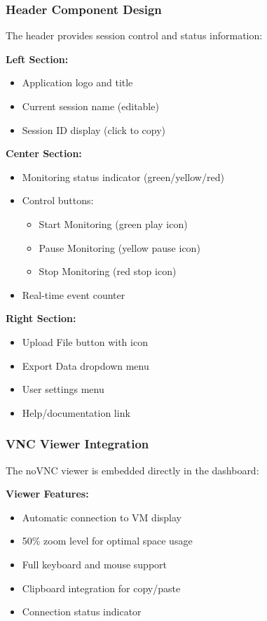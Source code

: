 \subsubsection{Header Component Design}

The header provides session control and status information:

\textbf{Left Section:}
\begin{itemize}
    \item Application logo and title
    \item Current session name (editable)
    \item Session ID display (click to copy)
\end{itemize}

\textbf{Center Section:}
\begin{itemize}
    \item Monitoring status indicator (green/yellow/red)
    \item Control buttons:
    \begin{itemize}
        \item Start Monitoring (green play icon)
        \item Pause Monitoring (yellow pause icon)
        \item Stop Monitoring (red stop icon)
    \end{itemize}
    \item Real-time event counter
\end{itemize}

\textbf{Right Section:}
\begin{itemize}
    \item Upload File button with icon
    \item Export Data dropdown menu
    \item User settings menu
    \item Help/documentation link
\end{itemize}

\subsubsection{VNC Viewer Integration}

The noVNC viewer is embedded directly in the dashboard:

\textbf{Viewer Features:}
\begin{itemize}
    \item Automatic connection to VM display
    \item 50\% zoom level for optimal space usage
    \item Full keyboard and mouse support
    \item Clipboard integration for copy/paste
    \item Connection status indicator
\end{itemize}

